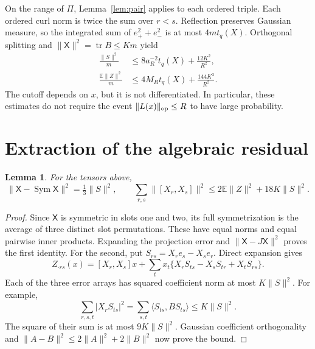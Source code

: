 \documentclass[11pt,reqno]{amsart}
\numberwithin{equation}{section}
\newtheorem{lemma}[theorem]{Lemma}
\theoremstyle{remark}
\newcommand{\E}{\mathbb E}
\newcommand{\X}{\mathsf X}
\DeclareMathOperator{\tr}{tr}
\DeclareMathOperator{\Sym}{Sym}
\begin{document}
On the range of $\Pi$, Lemma~\ref{lem:pair} applies to each ordered
triple. Each ordered curl norm is twice the sum over $r<s$.
Reflection preserves Gaussian measure, so the integrated sum of
$e_+^2+e_-^2$ is at most $4mt_q(X)$. Orthogonal splitting and
$\|\X\|^2=\tr B\le Km$ yield
\begin{align}
 \frac{\|S\|^2}{m}&\le8a_R^{-2}t_q(X)+\frac{12K^2}{R^2},\label{eq:Sbound}\\
 \frac{\E\|Z\|^2}{m}&\le4M_Rt_q(X)+\frac{144K^3}{R^2}.\label{eq:Zbound}
\end{align}
The cutoff depends on $x$, but it is not differentiated. In particular,
these estimates do not require the event $\|L(x)\|_{\rm op}\le R$ to
have large probability.

\section{Extraction of the algebraic residual}
\begin{lemma}\label{lem:algebra}
For the tensors above,
\begin{equation}\label{eq:symmetry}
 \|\X-\Sym\X\|^2=\tfrac13\|S\|^2,
 \qquad
 \sum_{r,s}\|[X_r,X_s]\|^2\le2\E\|Z\|^2+18K\|S\|^2.
\end{equation}
\end{lemma}
\begin{proof}
Since $\X$ is symmetric in slots one and two, its full symmetrization
is the average of three distinct slot permutations. These have equal
norms and equal pairwise inner products. Expanding the projection
error and $\|\X-J\X\|^2$ proves the first identity.
For the second, put $S_{rs}=X_re_s-X_se_r$. Direct expansion gives
\begin{equation}\label{eq:polynomial}
 Z_{\cdot rs}(x)=[X_r,X_s]x+
 \sum_t x_t\{X_rS_{ts}-X_sS_{tr}+X_tS_{rs}\}.
\end{equation}
Each of the three error arrays has squared coefficient norm at most
$K\|S\|^2$. For example,
\[
 \sum_{r,s,t}|X_rS_{ts}|^2
 =\sum_{s,t}\langle S_{ts},BS_{ts}\rangle\le K\|S\|^2.
\]
The square of their sum is at most $9K\|S\|^2$. Gaussian coefficient
orthogonality and $\|A-B\|^2\le2\|A\|^2+2\|B\|^2$ now prove the bound.
\end{proof}
\end{document}

